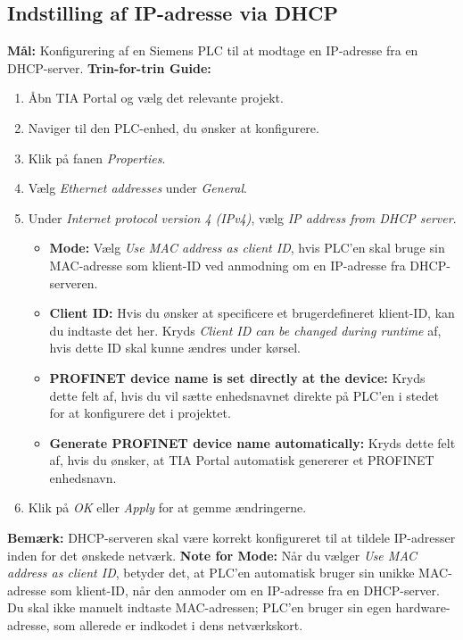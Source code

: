 \subsection*{Indstilling af IP-adresse via DHCP}
\label{subsec:dhcp_ip}
\textbf{Mål:} Konfigurering af en Siemens PLC til at modtage en IP-adresse fra en DHCP-server.
\newline\newline\noindent\textbf{Trin-for-trin Guide:}
\begin{enumerate}
	\item Åbn TIA Portal og vælg det relevante projekt.
	\item Naviger til den PLC-enhed, du ønsker at konfigurere.
	\item Klik på fanen \textit{Properties}.
	\item Vælg \textit{Ethernet addresses} under \textit{General}.
	\item Under \textit{Internet protocol version 4 (IPv4)}, vælg \textit{IP address from DHCP server}.
	\begin{itemize}
		\item \textbf{Mode:} Vælg \textit{Use MAC address as client ID}, hvis PLC'en skal bruge sin MAC-adresse som klient-ID ved anmodning om en IP-adresse fra DHCP-serveren.
		
		\item \textbf{Client ID:} Hvis du ønsker at specificere et brugerdefineret klient-ID, kan du indtaste det her. Kryds \textit{Client ID can be changed during runtime} af, hvis dette ID skal kunne ændres under kørsel.
		
		\item \textbf{PROFINET device name is set directly at the device:} Kryds dette felt af, hvis du vil sætte enhedsnavnet direkte på PLC'en i stedet for at konfigurere det i projektet.
		
		\item \textbf{Generate PROFINET device name automatically:} Kryds dette felt af, hvis du ønsker, at TIA Portal automatisk genererer et PROFINET enhedsnavn.
	\end{itemize}
	\item Klik på \textit{OK} eller \textit{Apply} for at gemme ændringerne.
\end{enumerate}
\textbf{Bemærk:} DHCP-serveren skal være korrekt konfigureret til at tildele IP-adresser inden for det ønskede netværk.
\newline\newline\noindent \textbf{Note for Mode:} Når du vælger \textit{Use MAC address as client ID}, betyder det, at PLC'en automatisk bruger sin unikke MAC-adresse som klient-ID, når den anmoder om en IP-adresse fra en DHCP-server. Du skal ikke manuelt indtaste MAC-adressen; PLC'en bruger sin egen hardware-adresse, som allerede er indkodet i dens netværkskort.
